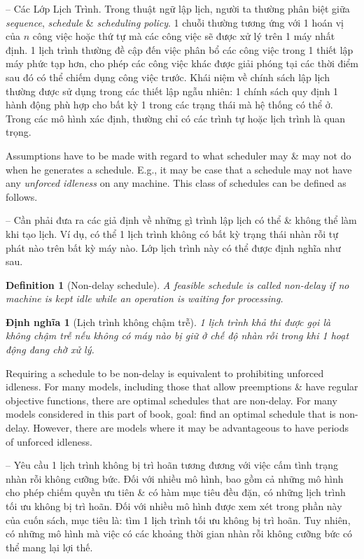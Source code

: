 \documentclass{article}
\newtheorem{definition}{Definition}
\newtheorem{dinhnghia}{Định nghĩa}
\begin{document}
\begin{itemize}
\begin{itemize}
        -- {\sf Các Lớp Lịch Trình.} Trong thuật ngữ lập lịch, người ta thường phân biệt giữa {\it sequence}, {\it schedule} \& {\it scheduling policy}. 1 chuỗi thường tương ứng với 1 hoán vị của $n$ công việc hoặc thứ tự mà các công việc sẽ được xử lý trên 1 máy nhất định. 1 lịch trình thường đề cập đến việc phân bổ các công việc trong 1 thiết lập máy phức tạp hơn, cho phép các công việc khác được giải phóng tại các thời điểm sau đó có thể chiếm dụng công việc trước. Khái niệm về chính sách lập lịch thường được sử dụng trong các thiết lập ngẫu nhiên: 1 chính sách quy định 1 hành động phù hợp cho bất kỳ 1 trong các trạng thái mà hệ thống có thể ở. Trong các mô hình xác định, thường chỉ có các trình tự hoặc lịch trình là quan trọng.

        Assumptions have to be made with regard to what scheduler may \& may not do when he generates a schedule. E.g., it may be case that a schedule may not have any {\it unforced idleness} on any machine. This class of schedules can be defined as follows.

        -- Cần phải đưa ra các giả định về những gì trình lập lịch có thể \& không thể làm khi tạo lịch. Ví dụ, có thể 1 lịch trình không có bất kỳ trạng thái nhàn rỗi tự phát nào trên bất kỳ máy nào. Lớp lịch trình này có thể được định nghĩa như sau.

        \begin{definition}[Non-delay schedule]
            A feasible schedule is called {\it non-delay} if no machine is kept idle while an operation is waiting for processing.
        \end{definition}

        \begin{dinhnghia}[Lịch trình không chậm trễ]
            1 lịch trình khả thi được gọi là {\it không chậm trễ} nếu không có máy nào bị giữ ở chế độ nhàn rỗi trong khi 1 hoạt động đang chờ xử lý.
        \end{dinhnghia}
        Requiring a schedule to be non-delay is equivalent to prohibiting unforced idleness. For many models, including those that allow preemptions \& have regular objective functions, there are optimal schedules that are non-delay. For many models considered in this part of book, goal: find an optimal schedule that is non-delay. However, there are models where it may be advantageous to have periods of unforced idleness.

        -- Yêu cầu 1 lịch trình không bị trì hoãn tương đương với việc cấm tình trạng nhàn rỗi không cưỡng bức. Đối với nhiều mô hình, bao gồm cả những mô hình cho phép chiếm quyền ưu tiên \& có hàm mục tiêu đều đặn, có những lịch trình tối ưu không bị trì hoãn. Đối với nhiều mô hình được xem xét trong phần này của cuốn sách, mục tiêu là: tìm 1 lịch trình tối ưu không bị trì hoãn. Tuy nhiên, có những mô hình mà việc có các khoảng thời gian nhàn rỗi không cưỡng bức có thể mang lại lợi thế.


\end{itemize}
\end{itemize}
\end{document}
